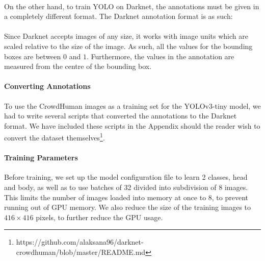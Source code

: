 \paragraph{}  

\paragraph{}On the other hand, to train YOLO on Darknet, the annotations must be given in a completely different format. The Darknet annotation format is as such:

\paragraph{}

\paragraph{}Since Darknet accepts images of any size, it works with image units which are scaled relative to the size of the image. As such, all the values for the bounding boxes are between $0$ and $1$. Furthermore, the  values in the annotation are measured from the centre of the bounding box.  

\paragraph{Converting Annotations} To use the CrowdHuman images as a training set for the YOLOv3-tiny model, we had to write several scripts that converted the annotations to the Darknet format. We have included these scripts in the Appendix should the reader wish to convert the dataset themselves\footnote{https://github.com/alaksana96/darknet-crowdhuman/blob/master/README.md}.

\paragraph{Training Parameters} Before training, we set up the model configuration file to learn 2 classes, head and body, as well as to use batches of 32 divided into subdivision of 8 images. This limits the number of images loaded into memory at once to 8, to prevent running out of GPU memory. We also reduce the size of the training images to $416\times 416$ pixels, to further reduce the GPU usage. \\

